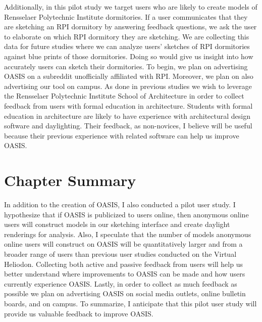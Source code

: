 	Additionally, in this pilot study we target users who are likely to create models of Rensselaer Polytechnic Institute dormitories. If a user communicates that they are sketching an RPI dormitory by answering feedback questions, we ask the user to elaborate on which RPI dormitory they are sketching. We are collecting this data for future studies where we can analyze users' sketches of RPI dormitories against blue prints of those dormitories. Doing so would give us insight into how accurately users can sketch their dormitories. To begin, we plan on advertising OASIS on a subreddit unofficially affiliated with RPI. Moreover, we plan on also advertising our tool on campus. As done in previous studies we wish to leverage the Rensselaer Polytechnic Institute School of Architecture in order to collect feedback from users with formal education in architecture. Students with formal education in architecture are likely to have experience with architectural design software and daylighting. Their feedback, as non-novices, I believe will be useful because their previous experience with related software can help us improve OASIS.


\section{Chapter Summary}


	In addition to the creation of OASIS, I also conducted a pilot user study. 
	I hypothesize that if OASIS is publicized to users online, then anonymous online users will construct models in our sketching interface and create daylight renderings for analysis.
	Also, I speculate that the number of models anonymous online users will construct on OASIS will be quantitatively larger and from a broader range of users than previous user studies conducted on the Virtual Heliodon.
	Collecting both active and passive feedback from users will help us better understand where improvements to OASIS can be made and how users currently experience OASIS.
	Lastly, in order to collect as much feedback as possible we plan on advertising OASIS on social media outlets, online bulletin boards, and on campus.
	To summarize, I anticipate  that this pilot user study will provide us valuable feedback to improve OASIS.





